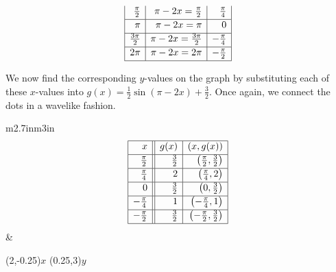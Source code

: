 \begin{ex}
\begin{enumerate}
\[\begin{array}{|r|r|r|}
\frac{\pi}{2}  &\pi - 2x = \frac{\pi}{2} & \frac{\pi}{4} \\ [2pt] \hline 

\pi & \pi - 2x = \pi & 0 \\ [2pt] \hline 

\frac{3\pi}{2}  & \pi - 2x = \frac{3\pi}{2} & -\frac{\pi}{4} \\ [2pt] \hline 

2\pi  &\pi - 2x = 2\pi & -\frac{\pi}{2}\\  [2pt] \hline
\end{array} \]
\setlength{\extrarowheight}{0pt}

We now find the corresponding $y$-values on the graph by substituting each of these $x$-values into  $g(x) = \frac{1}{2} \sin(\pi - 2x) + \frac{3}{2}$.  Once again, we connect the dots in a wavelike fashion.

\hspace{.5in} \begin{tabular}{m{2.7in}m{3in}}
\setlength{\extrarowheight}{2pt}
\setlength{\extrarowheight}{2pt}
\[ \begin{array}{|r||r|r|}  

\hline

 x & g(x) & (x,g(x)) \\ [2pt] \hline
\frac{\pi}{2} & \frac{3}{2} & \left(\frac{\pi}{2}, \frac{3}{2}\right)  \\ [2pt]   \hline

\frac{\pi}{4} & 2 & \left(\frac{\pi}{4}, 2\right) \\ [2pt] \hline 

0 & \frac{3}{2} & \left(0, \frac{3}{2} \right)  \\ [2pt] \hline 

-\frac{\pi}{4}  & 1 &  \left(-\frac{\pi}{4}, 1 \right) \\ [2pt] \hline 

-\frac{\pi}{2} & \frac{3}{2} & \left(-\frac{\pi}{2}, \frac{3}{2} \right) \\  [2pt] \hline
\end{array} \]
\setlength{\extrarowheight}{0pt} &

\begin{mfpic}[25]{-2}{2}{0}{3}

\axes
\tlabel[cc](2,-0.25){\scriptsize $x$}
\tlabel[cc](0.25,3){\scriptsize $y$}
\tlpointsep{4pt}
\end{mfpic} \\


\end{tabular}
\end{enumerate}
\end{ex}
